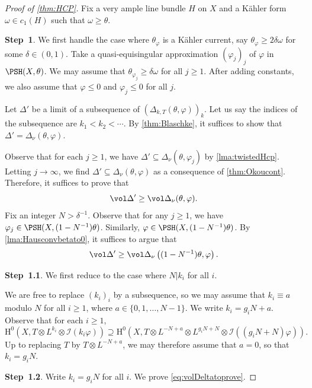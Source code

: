 \begin{proof}[Proof of \cref{thm:HCP}]
Fix a very ample line bundle $H$ on $X$ and a Kähler form $\omega\in c_1(H)$ such that $\omega\geq \theta$.

\textbf{Step~1}. We first handle the case where $\theta_{\varphi}$ is a Kähler current, say $\theta_{\varphi}\geq 2\delta\omega$ for some $\delta\in (0,1)$. Take a quasi-equisingular approximation $(\varphi_j)_j$ of $\varphi$ in $\PSH(X,\theta)$. We may assume that $\theta_{\varphi_j}\geq \delta\omega$ for all $j\geq 1$. After adding constants, we also assume that $\varphi\leq 0$ and $\varphi_j\leq 0$ for all $j$.

Let $\Delta'$ be a limit of a subsequence of $(\Delta_{k,T}(\theta,\varphi))_k$. Let us say the indices of the subsequence are $k_1<k_2<\cdots$. By \cref{thm:Blaschke}, it suffices to show that $\Delta'=\Delta_{\nu}(\theta,\varphi)$.

Observe that for each $j\geq 1$, we have $\Delta'\subseteq \Delta_{\nu}(\theta,\varphi_j)$ by \cref{lma:twistedHcp}. Letting $j\to \infty$, we find $\Delta'\subseteq \Delta_{\nu}(\theta,\varphi)$ as a consequence of \cref{thm:Okoucont}.
Therefore, it suffices to prove that
\[
    \vol \Delta'\geq \vol \Delta_{\nu}(\theta,\varphi).
\]
Fix an integer $N>\delta^{-1}$. Observe that for any $j\geq 1$, we have $\varphi_j\in \PSH(X,(1-N^{-1})\theta)$. Similarly, $\varphi\in \PSH(X,(1-N^{-1})\theta)$.
By \cref{lma:Hausconvbetato0}, it suffices to argue that
\begin{equation}\label{eq:volDeltatoprove}
\vol \Delta'\geq \vol \Delta_{\nu}\left((1-N^{-1})\theta,\varphi\right).
\end{equation}

\textbf{Step~1.1}. We first reduce to the case where $N|k_i$ for all $i$.

We are free to replace $(k_i)_i$ by a subsequence, so we may assume that $k_i\equiv a$ modulo $N$ for all $i\geq 1$, where $a\in \{0,1,\ldots,N-1\}$. We write $k_i=g_i N+a$.
Observe that for each $i\geq 1$,
\[
    \mathrm{H}^0\left(X,T\otimes L^{k_i}\otimes \mathcal{I}(k_i\varphi)\right)\supseteq \mathrm{H}^0\left(X,T\otimes L^{-N+a}\otimes L^{g_i N+ N}\otimes \mathcal{I}\left((g_iN+N)\varphi \right)\right).
\]
Up to replacing $T$ by $T\otimes L^{-N+a}$, we may therefore assume that $a=0$, so that $k_i=g_i N$.

\textbf{Step~1.2}. Write $k_i=g_i N$ for all $i$. We prove \eqref{eq:volDeltatoprove}.


\end{proof}
